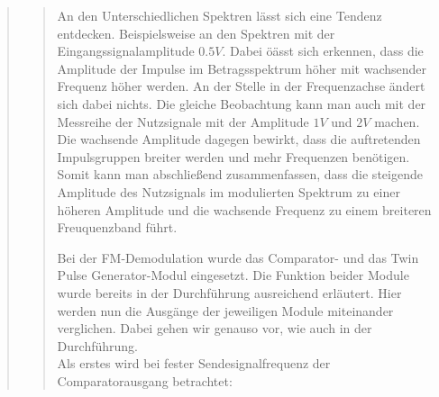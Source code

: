\begin{quote}
\begin{quote}
            
            An den Unterschiedlichen Spektren lässt sich eine Tendenz entdecken.
            Beispielsweise an den Spektren mit der Eingangssignalamplitude $0.5
            V$. Dabei öässt sich erkennen, dass die Amplitude der Impulse im
            Betragsspektrum höher mit wachsender Frequenz höher werden. An der
            Stelle in der Frequenzachse ändert sich dabei nichts. Die gleiche
            Beobachtung kann man auch mit der Messreihe der Nutzsignale mit der
            Amplitude $1V$ und $2V$ machen. Die wachsende Amplitude dagegen
            bewirkt, dass die auftretenden Impulsgruppen breiter werden und mehr
            Frequenzen benötigen. Somit kann man abschließend zusammenfassen,
            dass die steigende Amplitude des Nutzsignals im modulierten Spektrum
            zu einer höheren Amplitude und die wachsende Frequenz zu einem
            breiteren Freuquenzband führt.
            
            Bei der FM-Demodulation wurde das Comparator- und das Twin Pulse
            Generator-Modul eingesetzt. Die Funktion beider Module wurde bereits
            in der Durchführung ausreichend erläutert. Hier werden nun die
            Ausgänge der jeweiligen Module miteinander verglichen. Dabei gehen
            wir genauso vor, wie auch in der Durchführung.\\
            Als erstes wird bei fester Sendesignalfrequenz der Comparatorausgang
            betrachtet:
            

\end{quote}
\end{quote}

